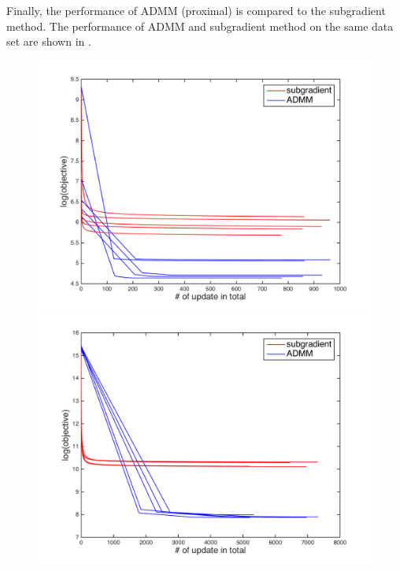\documentclass{article}
\begin{document}
Finally, the performance of ADMM (proximal) is compared to the subgradient method. The performance of ADMM and subgradient method on the same data set are shown in .
\begin{figure}[ht!]
  \centering
  \begin{minipage}{0.24\textwidth}
    \centering
    \includegraphics[width=1\textwidth]{../yanyu_code/plots/sym_subgrad_p10}
  \end{minipage}
  \hfill
  \begin{minipage}{0.24\textwidth}
    \centering
    \includegraphics[width=1\textwidth]{../yanyu_code/plots/asym_subgrad_p10}
  \end{minipage}
  \hfill
  \begin{minipage}{0.24\textwidth}

\end{minipage}
\end{figure}
\end{document}
